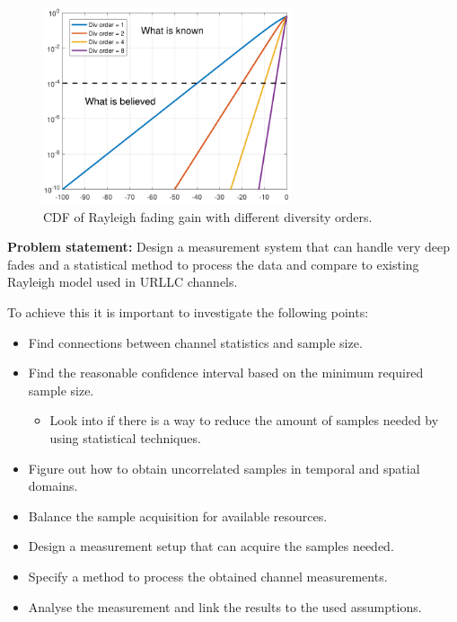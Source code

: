 \begin{figure}[H]
\centering
\includegraphics[width=0.65\textwidth]{figures/fading_gain.pdf}
\caption{\Gls{CDF} of Rayleigh fading gain with different diversity orders.}
\label{fading_gain}
\end{figure}


\textbf{Problem statement:}
Design a measurement system that can handle very deep fades and a statistical method to process the data and compare to existing Rayleigh model used in URLLC channels.




To achieve this it is important to investigate the following points: 
\begin{itemize}
	\item Find connections between channel statistics and sample size.
	\item Find the reasonable confidence interval based on the minimum required sample size.
	\begin{itemize}
	\item Look into if there is a way to reduce the amount of samples needed by using statistical techniques.
 	\end{itemize}
	\item Figure out how to obtain uncorrelated samples in temporal and spatial domains.
	\item Balance the sample acquisition for available resources. 
	\item Design  a measurement setup that can acquire the samples needed.
	\item Specify a method to process the obtained channel measurements.
	\item Analyse the measurement and link the results to the used assumptions.
\end{itemize}





